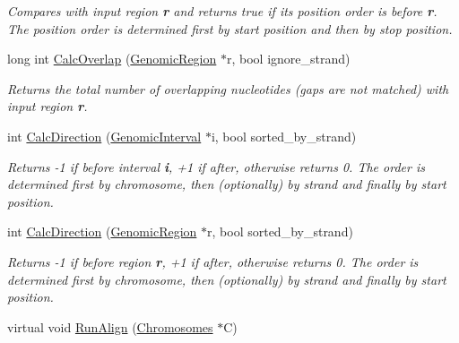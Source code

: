 \begin{CompactItemize}
\begin{CompactList}\small\item\em Compares with input region {\bf r} and returns true if its position order is before {\bf r}. The position order is determined first by start position and then by stop position. \item\end{CompactList}\item 
\hypertarget{classGenomicRegion_623e28aab180174d43873c4a85342ad4}{
long int \hyperlink{classGenomicRegion_623e28aab180174d43873c4a85342ad4}{CalcOverlap} (\hyperlink{classGenomicRegion}{GenomicRegion} $\ast$r, bool ignore\_\-strand)}
\label{classGenomicRegion_623e28aab180174d43873c4a85342ad4}

\begin{CompactList}\small\item\em Returns the total number of overlapping nucleotides (gaps are not matched) with input region {\bf r}. \item\end{CompactList}\item 
\hypertarget{classGenomicRegion_da548684fc4ae44dd3782aa15eaaf0a8}{
int \hyperlink{classGenomicRegion_da548684fc4ae44dd3782aa15eaaf0a8}{CalcDirection} (\hyperlink{classGenomicInterval}{GenomicInterval} $\ast$i, bool sorted\_\-by\_\-strand)}
\label{classGenomicRegion_da548684fc4ae44dd3782aa15eaaf0a8}

\begin{CompactList}\small\item\em Returns -1 if before interval {\bf i}, +1 if after, otherwise returns 0. The order is determined first by chromosome, then (optionally) by strand and finally by start position. \item\end{CompactList}\item 
\hypertarget{classGenomicRegion_b44366e44dc9a83da65b9593ce90dd32}{
int \hyperlink{classGenomicRegion_b44366e44dc9a83da65b9593ce90dd32}{CalcDirection} (\hyperlink{classGenomicRegion}{GenomicRegion} $\ast$r, bool sorted\_\-by\_\-strand)}
\label{classGenomicRegion_b44366e44dc9a83da65b9593ce90dd32}

\begin{CompactList}\small\item\em Returns -1 if before region {\bf r}, +1 if after, otherwise returns 0. The order is determined first by chromosome, then (optionally) by strand and finally by start position. \item\end{CompactList}\item 
\hypertarget{classGenomicRegion_90b0382a60f0a8532af73fc18f41364b}{
virtual void \hyperlink{classGenomicRegion_90b0382a60f0a8532af73fc18f41364b}{RunAlign} (\hyperlink{classChromosomes}{Chromosomes} $\ast$C)}
\label{classGenomicRegion_90b0382a60f0a8532af73fc18f41364b}


\end{CompactItemize}
